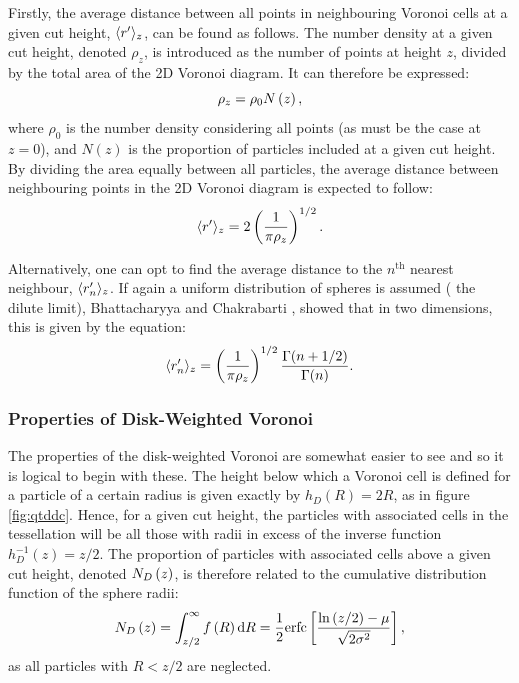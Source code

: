 Firstly, the average distance between all points in neighbouring Voronoi cells at a given cut height, $\langle r^\prime \rangle_z$, can be found as follows.
The number density at a given cut height, denoted $\rho_z$, is introduced as the number of points at height $z$, divided by the total area of the 2D Voronoi diagram.
It can therefore be expressed:
\begin{equation}
	\label{eq:numden}
	\rho_z = \rho_0 N\left(z\right),
\end{equation}
where $\rho_0$ is the number density considering all points (as must be the case at $z=0$), and $N\left(z\right)$ is the proportion of particles included at a given cut height.
By dividing the area equally between all particles, the average distance between neighbouring points in the 2D Voronoi diagram is expected to follow:
\begin{equation}
	\label{eq:ndist}
	\ed = 2\left(\frac{1}{\pi\rho_z}\right)^{1/2}.%
\end{equation}

Alternatively, one can opt to find the average distance to the $n^{\mathrm{th}}$ nearest neighbour, $\langle r^\prime_n \rangle_z$.
If again a uniform distribution of spheres is assumed (\ie{} the dilute limit), Bhattacharyya and Chakrabarti \cite{Bhattacharyya2008}, showed that in two dimensions, this is given by the equation:
\begin{equation}
	\label{eq:nndist}
	\langle r^\prime_n \rangle_z = \left(\frac{1}{\pi\rho_z}\right)^{1/2}\frac{\Gamma{\left(n+1/2\right)}}{\Gamma{\left(n\right)}}.
\end{equation}

\subsubsection{Properties of Disk\--Weighted Voronoi}

The properties of the disk\--weighted Voronoi are somewhat easier to see and so it is logical to begin with these.
The height below which a Voronoi cell is defined for a particle of a certain radius is given exactly by $h_D\left(R\right)=2R$, as in figure \ref{fig:qtddc}.
Hence, for a given cut height, the particles with associated cells in the tessellation will be all those with radii in excess of the inverse function $h_D^{-1}\left(z\right)=z/2$.
The proportion of particles with associated cells above a given cut height, denoted $N_D\left(z\right)$, is therefore related to the cumulative distribution function of the sphere radii:
\begin{equation}
	\label{eq:ndz}
	N_D\left(z\right) = \int_{z/2}^\infty f\left(R\right) \text{d}R = \frac{1}{2}\text{erfc}\left[\frac{\ln{\left(z/2\right)}-\mu}{\sqrt{2\sigma^2}}\right],
\end{equation}
as all particles with $R < z/2$ are neglected.

